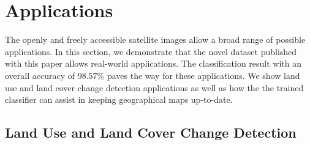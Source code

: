 \documentclass[journal]{IEEEtran}
\begin{document}





\section{Applications}
The openly and freely accessible satellite images allow a broad range of possible applications. In this section, we demonstrate that the novel dataset published with this paper allows real-world applications. The classification result with an overall accuracy of 98.57\% paves the way for these applications. We show land use and land cover change detection applications as well as how the the trained classifier can assist in keeping geographical maps up-to-date.

\subsection{Land Use and Land Cover Change Detection}
\end{document}
